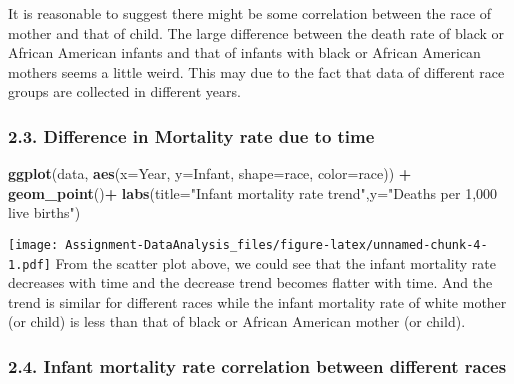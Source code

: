 \documentclass[]{article}
\newenvironment{Shaded}{\begin{snugshade}}{\end{snugshade}}
\newcommand{\DataTypeTok}[1]{\textcolor[rgb]{0.13,0.29,0.53}{#1}}
\newcommand{\KeywordTok}[1]{\textcolor[rgb]{0.13,0.29,0.53}{\textbf{#1}}}
\newcommand{\NormalTok}[1]{#1}
\newcommand{\OperatorTok}[1]{\textcolor[rgb]{0.81,0.36,0.00}{\textbf{#1}}}
\newcommand{\StringTok}[1]{\textcolor[rgb]{0.31,0.60,0.02}{#1}}
\begin{document}
It is reasonable to suggest there might be some correlation between the
race of mother and that of child. The large difference between the death
rate of black or African American infants and that of infants with black
or African American mothers seems a little weird. This may due to the
fact that data of different race groups are collected in different
years.

\hypertarget{difference-in-mortality-rate-due-to-time}{%
\subsubsection{2.3. Difference in Mortality rate due to
time}\label{difference-in-mortality-rate-due-to-time}}

\begin{Shaded}
\begin{Highlighting}[]
\KeywordTok{ggplot}\NormalTok{(data, }\KeywordTok{aes}\NormalTok{(}\DataTypeTok{x=}\NormalTok{Year, }\DataTypeTok{y=}\NormalTok{Infant, }\DataTypeTok{shape=}\NormalTok{race, }\DataTypeTok{color=}\NormalTok{race)) }\OperatorTok{+}
\StringTok{  }\KeywordTok{geom_point}\NormalTok{()}\OperatorTok{+}
\StringTok{  }\KeywordTok{labs}\NormalTok{(}\DataTypeTok{title=}\StringTok{"Infant mortality rate trend"}\NormalTok{,}\DataTypeTok{y=}\StringTok{"Deaths per 1,000 live births"}\NormalTok{)}
\end{Highlighting}
\end{Shaded}

\texttt{[image: Assignment-DataAnalysis\_files/figure-latex/unnamed-chunk-4-1.pdf]}
From the scatter plot above, we could see that the infant mortality rate
decreases with time and the decrease trend becomes flatter with time.
And the trend is similar for different races while the infant mortality
rate of white mother (or child) is less than that of black or African
American mother (or child).

\hypertarget{infant-mortality-rate-correlation-between-different-races}{%
\subsubsection{2.4. Infant mortality rate correlation between different
races}\label{infant-mortality-rate-correlation-between-different-races}}

\begin{Shaded}
\end{Shaded}
\end{document}

